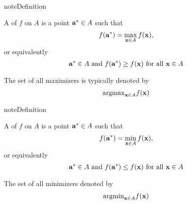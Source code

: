 \documentclass[letterpaper,10pt,english]{jupyterBook}
\begin{document}
\begin{sphinxadmonition}{note}{Definition}

\sphinxAtStartPar
A  of \(f\) on \(A\) is a point \({\bf a}^* \in A\) such that
\begin{equation*}
\begin{split}
%
f({\bf a}^*) = \max_{{\bf x} \in A} f({\bf x}),
%
\end{split}
\end{equation*}
\sphinxAtStartPar
or equivalently
\begin{equation*}
\begin{split}
{\bf a}^* \in A \text{ and } f({\bf a}^*) \geq f({\bf x}) \text{ for all
} {\bf x} \in A
\end{split}
\end{equation*}\end{sphinxadmonition}

\sphinxAtStartPar
The set of all maximizers is typically denoted by
\begin{equation*}
\begin{split}\mathrm{argmax}_{{\bf x} \in A}f({\bf x})\end{split}
\end{equation*}
\begin{sphinxadmonition}{note}{Definition}

\sphinxAtStartPar
A  of \(f\) on \(A\) is a point \({\bf a}^* \in A\) such that
\begin{equation*}
\begin{split}
%
f({\bf a}^*) = \min_{{\bf x} \in A} f({\bf x}),
%
\end{split}
\end{equation*}
\sphinxAtStartPar
or equivalently
\begin{equation*}
\begin{split}
%
{\bf a}^* \in A \text{ and } f({\bf a}^*) \leq f({\bf x}) \text{ for all
} {\bf x} \in A
%
\end{split}
\end{equation*}\end{sphinxadmonition}

\sphinxAtStartPar
The set of all minimizers denoted by
\begin{equation*}
\begin{split}\mathrm{argmin}_{{\bf x} \in A}f({\bf x})\end{split}
\end{equation*}
\end{document}
